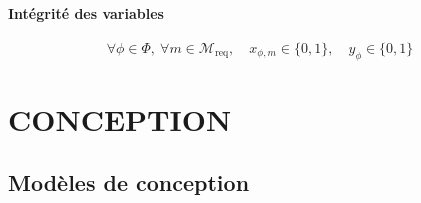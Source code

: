 \documentclass[12pt,a4paper]{report}
\begin{document}
	\subsection{Intégrité des variables}
	\[
	\forall \phi \in \Phi, \ \forall m \in \mathcal{M}_{\text{req}}, \quad x_{\phi, m} \in \{0, 1\}, \quad y_\phi \in \{0, 1\}
	\]

	\part{CONCEPTION}
    
    \chapter{Modèles de conception}
    

\end{document}
